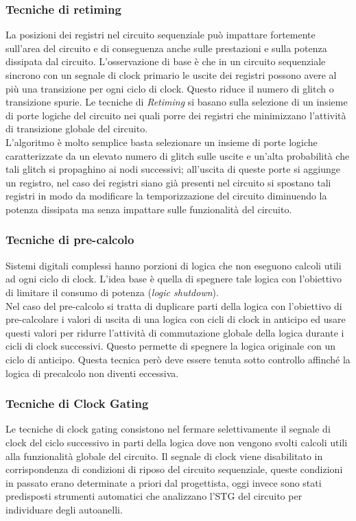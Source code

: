 \subsubsection{Tecniche di retiming}
La posizioni dei registri nel circuito sequenziale può impattare fortemente sull'area del circuito e di conseguenza anche sulle prestazioni e sulla potenza dissipata dal circuito. L'osservazione di base è che in un circuito sequenziale sincrono con un segnale di clock primario le uscite dei registri possono avere al più una transizione per ogni ciclo di clock. Questo riduce il numero di glitch o transizione spurie.
Le tecniche di \emph{Retiming} si basano sulla selezione di un insieme di porte logiche del circuito nei quali porre dei registri che minimizzano l'attività di transizione globale del circuito.\\
L'algoritmo è molto semplice basta selezionare un insieme di porte logiche caratterizzate da un elevato numero di glitch sulle uscite e un'alta probabilità che tali glitch si propaghino ai nodi successivi; all'uscita di queste porte si aggiunge un registro, nel caso dei registri siano già presenti nel circuito si spostano tali registri in modo da modificare la temporizzazione del circuito diminuendo la potenza dissipata ma senza impattare sulle funzionalità del circuito.
\subsubsection{Tecniche di pre-calcolo}
Sistemi digitali complessi hanno porzioni di logica che non eseguono calcoli utili  ad ogni ciclo di clock. L'idea base è quella di spegnere tale logica con l'obiettivo di limitare il consumo di potenza (\emph{logic shutdown}).\\
Nel caso del pre-calcolo si tratta di duplicare parti della logica con l'obiettivo di pre-calcolare i valori di uscita di una logica con cicli di clock in anticipo ed usare questi valori per ridurre l'attività di commutazione globale della logica durante i cicli di clock successivi.
Questo permette di spegnere la logica originale con un ciclo di anticipo. Questa tecnica però deve essere tenuta sotto controllo affinché la logica di precalcolo non diventi eccessiva.
\subsubsection{Tecniche di Clock Gating}
Le tecniche di clock gating consistono nel fermare selettivamente il segnale di clock del ciclo successivo in parti della logica dove non vengono svolti calcoli utili alla funzionalità globale del circuito.
Il segnale di clock viene disabilitato in corrispondenza di condizioni di riposo del circuito sequenziale, queste condizioni in passato erano determinate a priori dal progettista, oggi invece sono stati predisposti strumenti automatici che analizzano l'STG del circuito per individuare degli autoanelli.